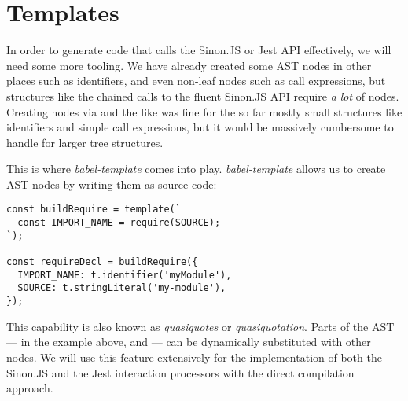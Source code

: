 \section{Templates}
In order to generate code that
calls the Sinon.JS or Jest API effectively,
we will need some more tooling.
We have already created some AST nodes in other places such as identifiers,
and even non-leaf nodes such as call expressions,
but structures like the chained calls to the fluent Sinon.JS API
require \textit{a lot} of nodes.
Creating nodes via  and the like was fine
for the so far mostly small structures like
identifiers and simple call expressions,
but it would be massively cumbersome to handle
for larger tree structures.

This is where \textit{babel-template} comes into play.
\textit{babel-template} allows us to create AST nodes
by writing them as source code:
\autocite{BabelTemplateDoc}
\begin{verbatim}
const buildRequire = template(`
  const IMPORT_NAME = require(SOURCE);
`);

const requireDecl = buildRequire({
  IMPORT_NAME: t.identifier('myModule'),
  SOURCE: t.stringLiteral('my-module'),
});
\end{verbatim}
This capability is also known as
\textit{quasiquotes} or \textit{quasiquotation}.
\autocite{LispQuasiquotation}
Parts of the AST
--- in the example above,  and  ---
can be dynamically substituted with other nodes.
We will use this feature extensively for the implementation
of both the Sinon.JS and the Jest interaction processors
with the direct compilation approach.

